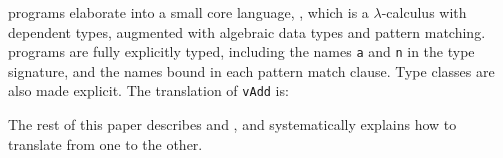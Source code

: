 \noindent
\Idris{} programs elaborate into a small core language, \TT{}, which is a $\lambda$-calculus
with dependent types, augmented with algebraic data types and pattern matching.
\TT{} programs are fully explicitly typed, including the names \texttt{a} and \texttt{n}
in the type signature, and the names bound in each pattern match clause.
Type classes are also made explicit.
The \TT{} translation of \texttt{vAdd} is:


\noindent
The rest of this paper describes \Idris{} and \TT{}, and systematically explains
how to translate from one to the other.


